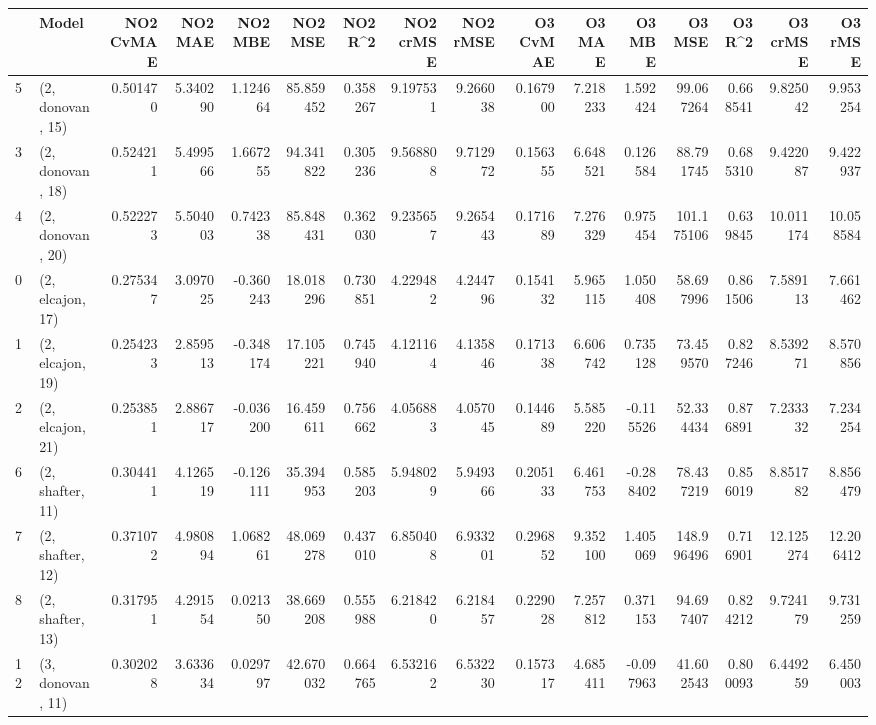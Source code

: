 \begin{tabular}{llrrrrrrrrrrrrrr}
\toprule
{} &             Model &  NO2 CvMAE &   NO2 MAE &   NO2 MBE &    NO2 MSE &   NO2 R\textasciicircum2 &  NO2 crMSE &  NO2 rMSE &  O3 CvMAE &    O3 MAE &    O3 MBE &      O3 MSE &    O3 R\textasciicircum2 &   O3 crMSE &    O3 rMSE \\
\midrule
5  &  (2, donovan, 15) &   0.501470 &  5.340290 &  1.124664 &  85.859452 &  0.358267 &   9.197531 &  9.266038 &  0.167900 &  7.218233 &  1.592424 &   99.067264 &  0.668541 &   9.825042 &   9.953254 \\
3  &  (2, donovan, 18) &   0.524211 &  5.499566 &  1.667255 &  94.341822 &  0.305236 &   9.568808 &  9.712972 &  0.156355 &  6.648521 &  0.126584 &   88.791745 &  0.685310 &   9.422087 &   9.422937 \\
4  &  (2, donovan, 20) &   0.522273 &  5.504003 &  0.742338 &  85.848431 &  0.362030 &   9.235657 &  9.265443 &  0.171689 &  7.276329 &  0.975454 &  101.175106 &  0.639845 &  10.011174 &  10.058584 \\
0  &  (2, elcajon, 17) &   0.275347 &  3.097025 & -0.360243 &  18.018296 &  0.730851 &   4.229482 &  4.244796 &  0.154132 &  5.965115 &  1.050408 &   58.697996 &  0.861506 &   7.589113 &   7.661462 \\
1  &  (2, elcajon, 19) &   0.254233 &  2.859513 & -0.348174 &  17.105221 &  0.745940 &   4.121164 &  4.135846 &  0.171338 &  6.606742 &  0.735128 &   73.459570 &  0.827246 &   8.539271 &   8.570856 \\
2  &  (2, elcajon, 21) &   0.253851 &  2.886717 & -0.036200 &  16.459611 &  0.756662 &   4.056883 &  4.057045 &  0.144689 &  5.585220 & -0.115526 &   52.334434 &  0.876891 &   7.233332 &   7.234254 \\
6  &  (2, shafter, 11) &   0.304411 &  4.126519 & -0.126111 &  35.394953 &  0.585203 &   5.948029 &  5.949366 &  0.205133 &  6.461753 & -0.288402 &   78.437219 &  0.856019 &   8.851782 &   8.856479 \\
7  &  (2, shafter, 12) &   0.371072 &  4.980894 &  1.068261 &  48.069278 &  0.437010 &   6.850408 &  6.933201 &  0.296852 &  9.352100 &  1.405069 &  148.996496 &  0.716901 &  12.125274 &  12.206412 \\
8  &  (2, shafter, 13) &   0.317951 &  4.291554 &  0.021350 &  38.669208 &  0.555988 &   6.218420 &  6.218457 &  0.229028 &  7.257812 &  0.371153 &   94.697407 &  0.824212 &   9.724179 &   9.731259 \\
12 &  (3, donovan, 11) &   0.302028 &  3.633634 &  0.029797 &  42.670032 &  0.664765 &   6.532162 &  6.532230 &  0.157317 &  4.685411 & -0.097963 &   41.602543 &  0.800093 &   6.449259 &   6.450003 \\

\end{tabular}
